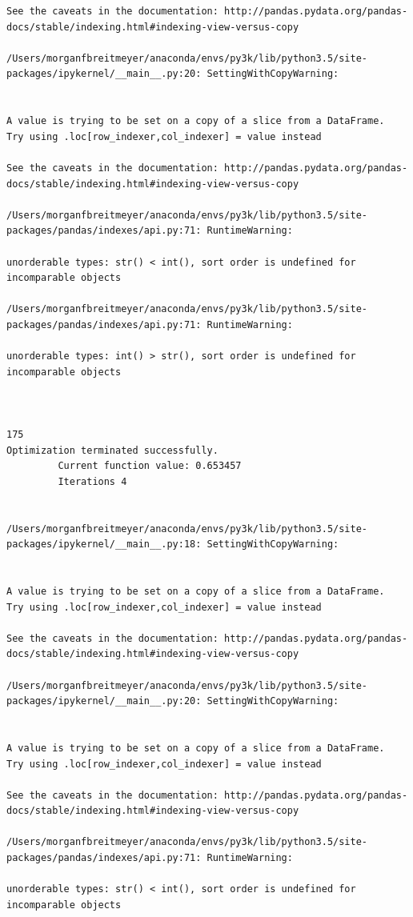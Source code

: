 \begin{lstlisting}
See the caveats in the documentation: http://pandas.pydata.org/pandas-docs/stable/indexing.html#indexing-view-versus-copy

/Users/morganfbreitmeyer/anaconda/envs/py3k/lib/python3.5/site-packages/ipykernel/__main__.py:20: SettingWithCopyWarning:


A value is trying to be set on a copy of a slice from a DataFrame.
Try using .loc[row_indexer,col_indexer] = value instead

See the caveats in the documentation: http://pandas.pydata.org/pandas-docs/stable/indexing.html#indexing-view-versus-copy

/Users/morganfbreitmeyer/anaconda/envs/py3k/lib/python3.5/site-packages/pandas/indexes/api.py:71: RuntimeWarning:

unorderable types: str() < int(), sort order is undefined for incomparable objects

/Users/morganfbreitmeyer/anaconda/envs/py3k/lib/python3.5/site-packages/pandas/indexes/api.py:71: RuntimeWarning:

unorderable types: int() > str(), sort order is undefined for incomparable objects



175
Optimization terminated successfully.
         Current function value: 0.653457
         Iterations 4


/Users/morganfbreitmeyer/anaconda/envs/py3k/lib/python3.5/site-packages/ipykernel/__main__.py:18: SettingWithCopyWarning:


A value is trying to be set on a copy of a slice from a DataFrame.
Try using .loc[row_indexer,col_indexer] = value instead

See the caveats in the documentation: http://pandas.pydata.org/pandas-docs/stable/indexing.html#indexing-view-versus-copy

/Users/morganfbreitmeyer/anaconda/envs/py3k/lib/python3.5/site-packages/ipykernel/__main__.py:20: SettingWithCopyWarning:


A value is trying to be set on a copy of a slice from a DataFrame.
Try using .loc[row_indexer,col_indexer] = value instead

See the caveats in the documentation: http://pandas.pydata.org/pandas-docs/stable/indexing.html#indexing-view-versus-copy

/Users/morganfbreitmeyer/anaconda/envs/py3k/lib/python3.5/site-packages/pandas/indexes/api.py:71: RuntimeWarning:

unorderable types: str() < int(), sort order is undefined for incomparable objects


\end{lstlisting}
